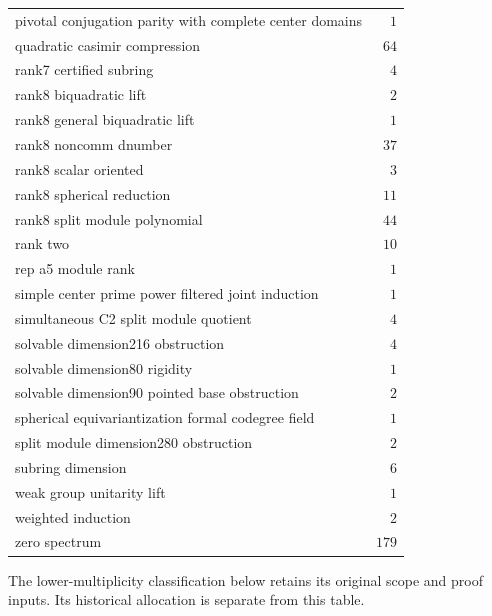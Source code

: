 \begin{center}
\begin{longtable}{@{}p{}r@{}}
pivotal conjugation parity with complete center domains & $1$\\
quadratic casimir compression & $64$\\
rank7 certified subring & $4$\\
rank8 biquadratic lift & $2$\\
rank8 general biquadratic lift & $1$\\
rank8 noncomm dnumber & $37$\\
rank8 scalar oriented & $3$\\
rank8 spherical reduction & $11$\\
rank8 split module polynomial & $44$\\
rank two & $10$\\
rep a5 module rank & $1$\\
simple center prime power filtered joint induction & $1$\\
simultaneous C2 split module quotient & $4$\\
solvable dimension216 obstruction & $4$\\
solvable dimension80 rigidity & $1$\\
solvable dimension90 pointed base obstruction & $2$\\
spherical equivariantization formal codegree field & $1$\\
split module dimension280 obstruction & $2$\\
subring dimension & $6$\\
weak group unitarity lift & $1$\\
weighted induction & $2$\\
zero spectrum & $179$\\
\bottomrule\end{longtable}\end{center}
The lower-multiplicity classification below retains its original scope and
proof inputs. Its historical allocation is separate from this table.







